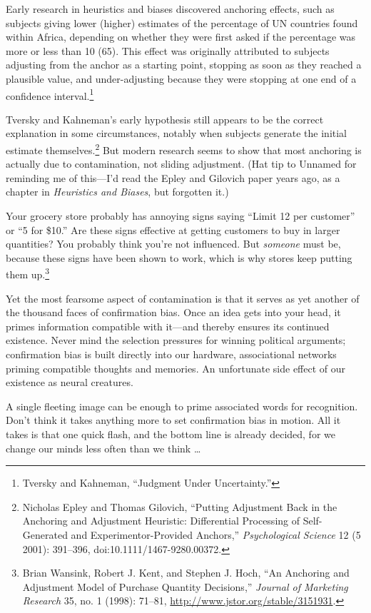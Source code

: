 {
 Early research in heuristics and biases discovered anchoring
effects, such as subjects giving lower (higher) estimates of the
percentage of UN countries found within Africa, depending on whether
they were first asked if the percentage was more or less than 10 (65).
This effect was originally attributed to subjects adjusting from the
anchor as a starting point, stopping as soon as they reached a
plausible value, and under-adjusting because they were stopping at one
end of a confidence interval.\footnote{Tversky and Kahneman, ``Judgment Under
Uncertainty.''}}

{
 Tversky and Kahneman's early hypothesis still
appears to be the correct explanation in some circumstances, notably
when subjects generate the initial estimate
themselves.\footnote{Nicholas Epley and Thomas Gilovich, ``Putting
Adjustment Back in the Anchoring and Adjustment Heuristic: Differential
Processing of Self-Generated and Experimentor-Provided
Anchors,'' \textit{Psychological Science} 12 (5
2001): 391--396, doi:10.1111/1467-9280.00372.} But modern research seems to show that
most anchoring is actually due to contamination, not sliding
adjustment. (Hat tip to Unnamed for reminding me of
this---I'd read the Epley and Gilovich paper years ago,
as a chapter in \textit{Heuristics and Biases}, but forgotten it.)}

{
 Your grocery store probably has annoying signs saying
``Limit 12 per customer'' or
``5 for \$10.'' Are these signs
effective at getting customers to buy in larger quantities? You
probably think you're not influenced. But
\textit{someone} must be, because these signs have been shown to work,
which is why stores keep putting them up.\footnote{Brian Wansink, Robert J. Kent, and Stephen J. Hoch,
``An Anchoring and Adjustment Model of Purchase
Quantity Decisions,'' \textit{Journal of Marketing
Research} 35, no. 1 (1998): 71--81,
\url{http://www.jstor.org/stable/3151931}.}}

{
 Yet the most fearsome aspect of contamination is that it serves as
yet another of the thousand faces of confirmation bias. Once an idea
gets into your head, it primes information compatible with it---and
thereby ensures its continued existence. Never mind the selection
pressures for winning political arguments; confirmation bias is built
directly into our hardware, associational networks priming compatible
thoughts and memories. An unfortunate side effect of our existence as
neural creatures.}

{
 A single fleeting image can be enough to prime associated words
for recognition. Don't think it takes anything more to
set confirmation bias in motion. All it takes is that one quick flash,
and the bottom line is already decided, for we change our minds less
often than we think \ldots}

